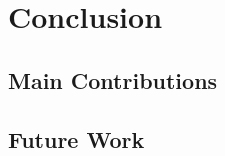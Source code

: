 \documentclass[ oneside,%
                    author={George Herbert},
                    degree={MSci},
                     title={Diffusion Models for Time-Evolving Precipitation Fields},
                  subtitle={}]{dissertation}
\begin{document}

\chapter{Conclusion}
\label{chap:conclusion}

\section{Main Contributions}

\section{Future Work}


%
%
%

\backmatter






\end{document}
